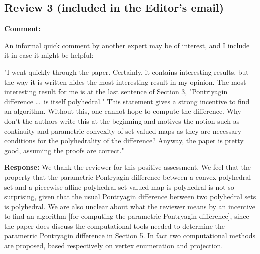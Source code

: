 \documentclass[11pt, a4paper]{article}
\newcommand{\comment}[1]{{%
\begin{sffamily}\leavevmode\color{black}#1
\end{sffamily}}}%
\def\v{\vspace{2mm}}
\begin{document}
\newpage

\subsection*{Review 3 (included in the Editor's email)}

\textbf{Comment:}
\comment{
An informal quick comment by another expert may be of interest,
and I include it in case it might be helpful:

"I went quickly through the paper. Certainly, it contains interesting results, but the
way it is written hides the most interesting result in my opinion. The most interesting
result for me is at the last sentence of Section 3, "Pontriyagin difference \dots\ is itself
polyhedral." This statement gives a strong incentive to find an algorithm. Without this,
one cannot hope to compute the difference. Why don't the authors write this at the
beginning and motives the notion such as continuity and parametric convexity of
set-valued maps as they are necessary conditions for the polyhedrality of the difference?
Anyway, the paper is pretty good, assuming the proofs are correct."
}

\v
\textbf{Response:}
We thank the reviewer for this positive assessment. We feel that the property that the parametric Pontryagin difference between a convex polyhedral set and a piecewise affine polyhedral set-valued map is polyhedral is not so surprising, given that the usual Pontryagin difference between two polyhedral sets is polyhedral. We are also unclear about what the reviewer means by an incentive to find an algorithm [for computing the parametric Pontryagin difference], since the paper does discuss the computational tools needed to determine the parametric Pontryagin difference in Section 5. In fact two computational methods are proposed, based respectively on vertex enumeration and projection.
\end{document}
